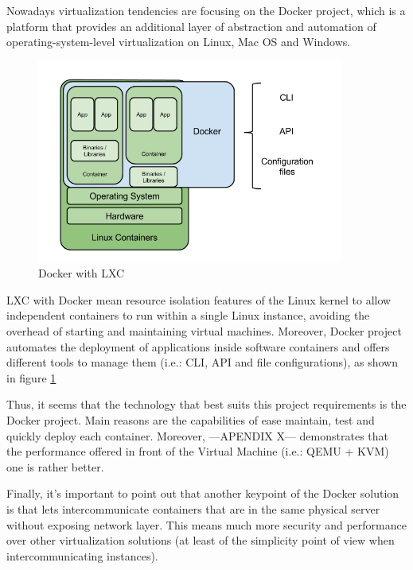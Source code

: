 \begin{itemize}
Nowadays virtualization tendencies are focusing on the Docker project, which is a platform that provides an additional layer of abstraction and automation of operating-system-level virtualization on Linux, Mac OS and Windows.
\begin{figure}[!htb]
\begin{center}
\includegraphics[width=0.9\textwidth]{./images/LXC.png}
\caption{Docker with LXC}
\label{F:DockerAndLXC}
\end{center}
\end{figure}

LXC with Docker mean resource isolation features of the Linux kernel to allow independent containers to run within a single Linux instance, avoiding the overhead of starting and maintaining virtual machines. Moreover, Docker project automates the deployment of applications inside software containers and offers different tools to manage them (i.e.: CLI, API and file configurations), as shown in figure \ref{F:DockerAndLXC} 
\end{itemize}

Thus, it seems that the technology that best suits this project requirements is the Docker project. Main reasons are the capabilities of ease maintain, test and quickly deploy each container. Moreover, ---APENDIX X--- demonstrates that the performance offered in front of the Virtual Machine (i.e.: QEMU + KVM) one is rather better.

Finally, it's important to point out that another keypoint of the Docker solution is that lets intercommunicate containers that are in the same physical server without exposing network layer. This means much more security and performance over other virtualization solutions (at least of the simplicity point of view when intercommunicating instances).

